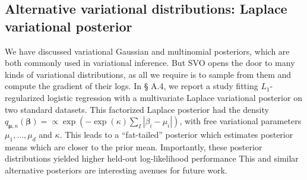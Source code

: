 \subsection{Alternative variational distributions: Laplace variational posterior}
\label{section:complicated_posteriors}
We have discussed variational Gaussian and multinomial posteriors,
which are both commonly used in variational inference.  But SVO opens
the door to many kinds of variational distributions, as all we require
is to sample from them and compute the gradient of their logs.  In \S
A.4, we report a study fitting $L_1$-regularized logistic regression
with a multivariate Laplace variational posterior on two standard
datasets.  This factorized Laplace posterior had the density $q_{\bm
  \mu, \kappa}( \bm \beta ) = \propto \exp( - \exp(\kappa) \sum_I |
\beta_i - \mu_i | )$, with free variational parameters $\mu_1, \ldots,
\mu_d$ and $\kappa$.  This leads to a ``fat-tailed'' posterior which
estimates posterior means which are closer to the prior mean.  Importantly,
these posterior distributions yielded higher held-out log-likelihood
performance This and similar alternative posteriors are interesting
avenues for future work.



